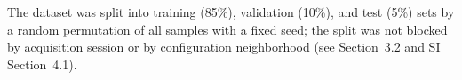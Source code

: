 The dataset was split into training (85\%), validation (10\%), and test (5\%) sets by a random permutation of all samples with a fixed seed; the split was not blocked by acquisition session or by configuration neighborhood (see Section~3.2 and SI Section~4.1).

